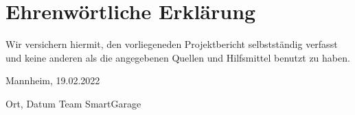 \clearpage
\chapter*{Ehrenwörtliche Erklärung}


Wir versichern hiermit, den vorliegeneden Projektbericht selbstständig verfasst und 
keine anderen als die angegebenen Quellen und Hilfsmittel benutzt zu haben. 


\vspace{3cm}
Mannheim, 19.02.2022 \newline


Ort, Datum \hfill Team SmartGarage
